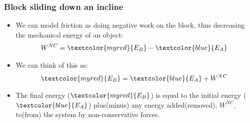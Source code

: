 \documentclass[aspectratio=169,
hyperref={colorlinks,urlcolor=blue}
]{beamer}
\begin{document}
\subsubsection{Block sliding down an incline}
\label{subsec:blockslidingdownanincline}
{

\begin{itemize}
\item We can model friction as doing negative work on the block, thus decreasing the mechanical energy of an object:
\begin{align*}
W^{NC}=\textcolor{myred}{E_B}-\textcolor{blue}{E_A}
\end{align*}
\item<3-> We can think of this as:
\begin{align*}
\textcolor{myred}{E_B}=\textcolor{blue}{E_A}+W^{NC}
\end{align*}
\item<3> The final energy ($\textcolor{myred}{E_B}$) is equal to the initial energy ($\textcolor{blue}{E_A}$) plus(minus) any energy added(removed), $W^{NC}$, to(from) the system by non-conservative forces.
\end{itemize}

}
\end{document}

